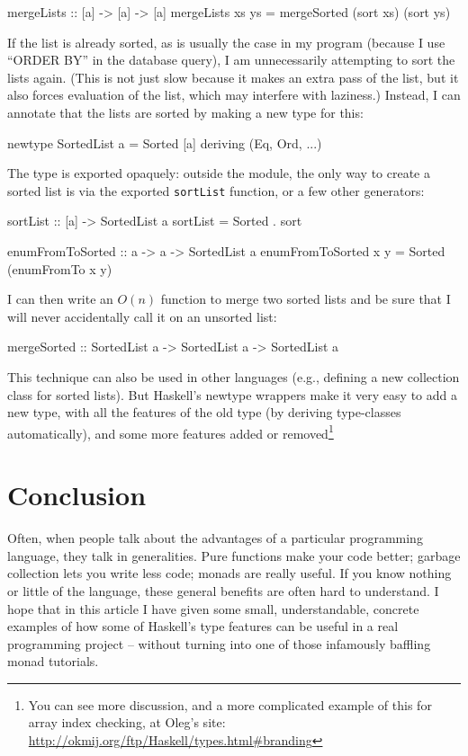 \documentclass{tmr}
\begin{document}
\begin{code}
mergeLists :: [a] -> [a] -> [a]
mergeLists xs ys = mergeSorted (sort xs) (sort ys)
\end{code}

If the list is already sorted, as is usually the case in my program (because I use ``ORDER BY'' in the database query), I am unnecessarily attempting to sort the lists again.  (This is not just slow because it makes an extra pass of the list, but it also forces evaluation of the list, which may interfere with laziness.)  Instead, I can annotate that the lists are sorted by making a new type for this:

\begin{code}
newtype SortedList a = Sorted [a] deriving (Eq, Ord, ...)
\end{code}

The type is exported opaquely: outside the module, the only way to create a sorted list is via the exported \lstinline|sortList| function, or a few other generators:

\begin{code}
sortList :: [a] -> SortedList a
sortList = Sorted . sort

enumFromToSorted :: a -> a -> SortedList a
enumFromToSorted x y = Sorted (enumFromTo x y)
\end{code}

I can then write an $O(n)$ function to merge two sorted lists and be sure that I will never accidentally call it on an unsorted list:

\begin{code}
mergeSorted :: SortedList a -> SortedList a -> SortedList a
\end{code}

This technique can also be used in other languages (e.g., defining a new collection class for sorted lists).  But Haskell's newtype wrappers make it very easy to add a new type, with all the features of the old type (by deriving type-classes automatically), and some more features added or removed\footnote{You can see more discussion, and a more complicated example of this for array index checking, at Oleg's site: \url{http://okmij.org/ftp/Haskell/types.html\#branding}}

\section{Conclusion}

Often, when people talk about the advantages of a particular programming language, they talk in generalities.  Pure functions make your code better; garbage collection lets you write less code; monads are really useful.  If you know nothing or little of the language, these general benefits are often hard to understand.  I hope that in this article I have given some small, understandable, concrete examples of how some of Haskell's type features can be useful in a real programming project -- without turning into one of those infamously baffling monad tutorials.
\end{document}
